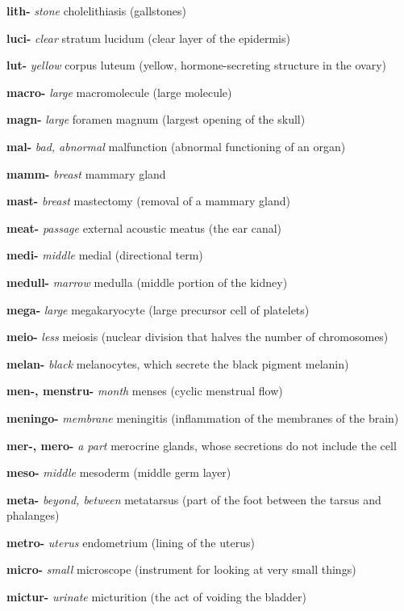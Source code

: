 \documentclass[10pt]{article}
\begin{document}
\begin{multicols}{2}
\begin{hangparas}{10pt}{1}
 \textbf{lith-} \textit{stone} cholelithiasis (gallstones) \par
 \textbf{luci-} \textit{clear} stratum lucidum (clear layer of the epidermis) \par
 \textbf{lut-} \textit{yellow} corpus luteum (yellow, hormone-secreting structure in the ovary) \par
 \textbf{macro-} \textit{large} macromolecule (large molecule) \par
 \textbf{magn-} \textit{large} foramen magnum (largest opening of the skull) \par
 \textbf{mal-} \textit{bad, abnormal} malfunction (abnormal functioning of an organ) \par
 \textbf{mamm-} \textit{breast} mammary gland \par
 \textbf{mast-} \textit{breast} mastectomy (removal of a mammary gland) \par
 \textbf{meat-} \textit{passage} external acoustic meatus (the ear canal) \par
 \textbf{medi-} \textit{middle} medial (directional term) \par
 \textbf{medull-} \textit{marrow} medulla (middle portion of the kidney) \par
 \textbf{mega-} \textit{large} megakaryocyte (large precursor cell of platelets) \par
 \textbf{meio-} \textit{less} meiosis (nuclear division that halves the number of chromosomes) \par
 \textbf{melan-} \textit{black} melanocytes, which secrete the black pigment melanin) \par
 \textbf{men-, menstru-} \textit{month} menses (cyclic menstrual flow) \par
 \textbf{meningo-} \textit{membrane} meningitis (inflammation of the membranes of the brain) \par
 \textbf{mer-, mero-} \textit{a part} merocrine glands, whose secretions do not include the cell \par
 \textbf{meso-} \textit{middle} mesoderm (middle germ layer) \par
 \textbf{meta-} \textit{beyond, between} metatarsus (part of the foot between the tarsus and phalanges) \par
 \textbf{metro-} \textit{uterus} endometrium (lining of the uterus) \par
 \textbf{micro-} \textit{small} microscope (instrument for looking at very small things) \par
 \textbf{mictur-} \textit{urinate} micturition (the act of voiding the bladder) \par

\end{hangparas}
\end{multicols}
\end{document}
